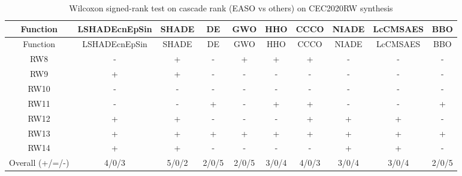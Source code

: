 \begin{center}
\small
\renewcommand{\arraystretch}{1.25}
\begin{longtable}{cccccccccc}
\caption{Wilcoxon signed-rank test on cascade rank (EASO vs others) on CEC2020RW  synthesis}
\label{tab:wilcoxon_cascade_CEC2020RW_synthesis} \\
\toprule
Function & LSHADEcnEpSin & SHADE & DE & GWO & HHO & CCCO & NIADE & LcCMSAES & BBO \\
\midrule
\endfirsthead
\toprule
Function & LSHADEcnEpSin & SHADE & DE & GWO & HHO & CCCO & NIADE & LcCMSAES & BBO \\
\midrule
\endhead
RW8 & - & + & - & + & + & + & - & - & - \\
RW9 & + & + & - & - & - & - & - & - & - \\
RW10 & - & - & - & - & - & - & - & - & - \\
RW11 & - & - & + & - & + & + & - & - & + \\
RW12 & + & + & - & - & - & + & + & + & - \\
RW13 & + & + & + & + & + & + & + & + & + \\
RW14 & + & + & - & - & - & - & + & + & - \\
\midrule
Overall (+/=/-) & 4/0/3 & 5/0/2 & 2/0/5 & 2/0/5 & 3/0/4 & 4/0/3 & 3/0/4 & 3/0/4 & 2/0/5 \\
\bottomrule
\end{longtable}
\end{center}